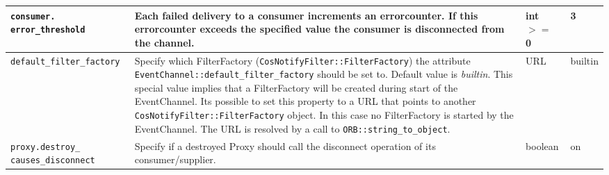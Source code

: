 \begin{small}
\begin{longtable}{|p{5cm}|p{7.5cm}|p{1.5cm}|p{1.5cm}|}
    \verb"consumer."
    \verb"error_threshold" &

    Each failed delivery to a consumer increments an errorcounter. If this
    errorcounter exceeds the specified value the consumer is
    disconnected from the channel. &

    int $>=$ 0 & 3 \\ \hline

    \verb"default_filter_factory" &

    Specify which FilterFactory (\texttt{CosNotifyFilter::FilterFactory}) the
    attribute \texttt{EventChannel::\-default\_filter\_factory} should be set to. 
    Default value is \emph{builtin}. This special value implies that a
    FilterFactory will be created during start of the EventChannel.
    Its possible to set this property to a URL that points to another
    \texttt{CosNotifyFilter::FilterFactory} object. In this case no FilterFactory
    is started by the EventChannel. The URL is resolved by a call
    to \texttt{ORB::string\_to\_object}. &

    URL & builtin \\ \hline

    \verb"proxy.destroy_"
    \verb"causes_disconnect" &

    Specify if a destroyed Proxy should call the disconnect operation
    of its consumer/supplier. &

    boolean & on \\ \hline

 

  \end{longtable}
\end{small}


